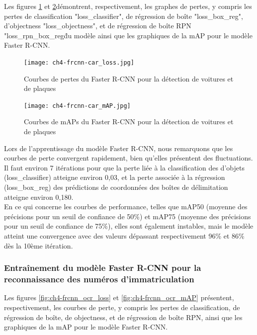 Les figures \ref{fig:ch4-frcnn-car_loss} et \ref{fig:ch4-frcnn-car_mAP}démontrent, respectivement, les graphes de pertes, y compris les pertes de classification "loss\_classifier", de régression de boîte "loss\_box\_reg", d'objectness "loss\_objectness", et de régression de boîte RPN "loss\_rpn\_box\_reg\" du modèle ainsi que les graphiques de la mAP pour le modèle Faster R-CNN.


\begin{figure}[H]
	\centering
	\texttt{[image: ch4-frcnn-car\_loss.jpg]}
	\caption{Courbes de pertes du Faster R-CNN pour la détection de voitures et de plaques }
\label{fig:ch4-frcnn-car_loss}
\end{figure}

\begin{figure}[H]
	\centering
	\texttt{[image: ch4-frcnn-car\_mAP.jpg]}
	\caption{Courbes de mAPs du Faster R-CNN pour la détection de voitures et de plaques}
\label{fig:ch4-frcnn-car_mAP}
\end{figure}

Lors de l'apprentissage du modèle Faster R-CNN, nous remarquons que les courbes de perte convergent rapidement, bien qu'elles présentent des fluctuations. Il faut environ 7 itérations pour que la perte liée à la classification des d'objets (loss\_classifier)  atteigne environ 0,03, et la perte associée à la régression (loss\_box\_reg) des prédictions de coordonnées des boîtes de délimitation atteigne environ 0,180.\\
En ce qui concerne les courbes de performance, telles que mAP50 (moyenne des précisions pour un seuil de confiance de 50\%) et mAP75 (moyenne des précisions pour un seuil de confiance de 75\%), elles sont également instables, mais le modèle atteint une convergence avec des valeurs dépassant respectivement 96\% et 86\% dès la 10ème itération.


\subsubsection{Entraînement du modèle Faster R-CNN pour la reconnaissance des numéros d'immatriculation}

Les figures \ref{fig:ch4-frcnn_ocr_loss} et \ref{fig:ch4-frcnn_ocr_mAP} présentent, respectivement, les courbes de perte, y compris les pertes de classification, de régression de boîte, de objectness, et de régression de boîte RPN, ainsi que les graphiques de la mAP pour le modèle Faster R-CNN.


